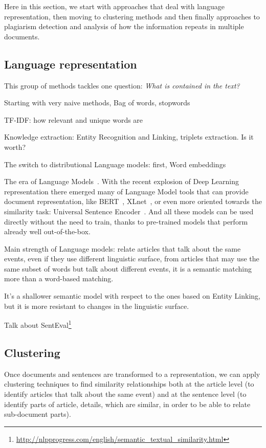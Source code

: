 Here in this section, we start with approaches that deal with language representation, then moving to clustering methods and then finally approaches to plagiarism detection and analysis of how the information repeats in multiple documents.

\subsection{Language representation}

This group of methods tackles one question: \emph{What is contained in the text?}

Starting with very naive methods,
Bag of words, stopwords

TF-IDF: how relevant and unique words are\cite{jones1972statistical}

Knowledge extraction: Entity Recognition and Linking, triplets extraction. Is it worth?

The switch to distributional Language models:
first, Word embeddings

The era of Language Models~\cite{devlin2018bert,cer2018universal,yang2019xlnet}.
With the recent explosion of Deep Learning representation there emerged many of Language Model tools that can provide document representation, like BERT~\cite{devlin2018bert}, XLnet~\cite{yang2019xlnet}, or even more oriented towards the similarity task: Universal Sentence Encoder~\cite{cer2018universal}.
And all these models can be used directly without the need to train, thanks to pre-trained models that perform already well out-of-the-box.

Main strength of Language models:
relate articles that talk about the same events, even if they use different linguistic surface, from articles that may use the same subset of words but talk about different events, it is a semantic matching more than a word-based matching. 

It's a shallower semantic model with respect to the ones based on Entity Linking, but it is more resistant to changes in the linguistic surface.

Talk about SentEval\footnote{\url{http://nlpprogress.com/english/semantic_textual_similarity.html}}

\subsection{Clustering}

Once documents and sentences are transformed to a representation, we can apply clustering techniques to find similarity relationships both at the article level (to identify articles that talk about the same event) and at the sentence level (to identify parts of article, details, which are similar, in order to be able to relate sub-document parts).

